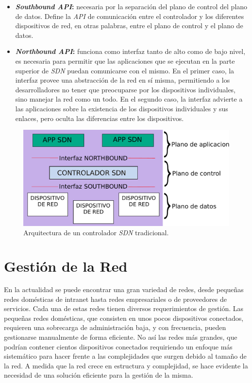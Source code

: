 \begin{itemize}
	\item \textbf{\textit{Southbound API}:} necesaria por la separación del plano de control del plano de datos. Define la \textit{API} de comunicación entre el controlador y los diferentes dispositivos de red, en otras palabras, entre el plano de control y el plano de datos.  
	\item \textbf{\textit{Northbound API}:} funciona como interfaz tanto de alto como de bajo nivel, es necesaria para permitir que las aplicaciones que se ejecutan en la parte superior de \textit{SDN} puedan comunicarse con el mismo. En el primer caso, la interfaz provee una abstracción de la red en sí misma, permitiendo a los desarrolladores no tener que preocuparse por los dispositivos individuales, sino manejar la red como un todo. En el segundo caso, la interfaz advierte a las aplicaciones sobre la existencia de los dispositivos individuales y sus enlaces, pero oculta las diferencias entre los dispositivos. 
\end{itemize}


\begin{figure}[htbp]
	\centering
	\includegraphics[scale=0.5]{Figures/arquitectura-controlador.pdf}
	\caption{Arquitectura de un controlador \textit{SDN} tradicional.}
	\label{fig:arquitectura_sdn}
  \end{figure}

\section{Gestión de la Red} \label{sec:gestionred}
En la actualidad se puede encontrar una gran variedad de redes, desde pequeñas redes domésticas de intranet hasta redes empresariales o de proveedores de servicios. Cada una de estas redes tienen diversos requerimientos de gestión.  Las pequeñas redes domésticas, que consisten en unos pocos dispositivos conectados, requieren una sobrecarga de administración baja, y con frecuencia, pueden gestionarse manualmente de forma eficiente. No así las redes más grandes, que podrían contener cientos dispositivos conectados requiriendo un enfoque más sistemático para hacer frente a las complejidades que surgen debido al tamaño de la red. A medida que la red crece en estructura y complejidad, se hace evidente la necesidad de una solución eficiente para la gestión de la misma.

